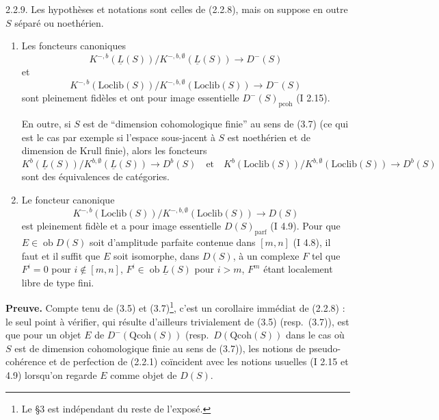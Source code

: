\begin{proposition} 2.2.9.
Les hypoth\`{e}ses et notations sont celles de (2.2.8), mais on suppose en outre $S$ s\'{e}par\'{e} ou noeth\'{e}rien.
\begin{enumerate}
\item[a)] Les foncteurs canoniques
\[
K^{-,b}(\underline{L}(S)) / K^{-,b,\emptyset}(\underline{L}(S)) \longrightarrow D^-(S)
\]
et
\[
K^{-,b}(\mathrm{Loclib}(S)) / K^{-,b,\emptyset}(\mathrm{Loclib}(S)) \longrightarrow D^-(S)
\]
sont pleinement fid\`{e}les et ont pour image essentielle $D^-(S)_{\mathrm{pcoh}}$ (I 2.15).

En outre, si $S$ est de ``dimension cohomologique finie'' au sens de (3.7) (ce qui est le cas par exemple si l'espace sous-jacent \`{a} $S$ est noeth\'{e}rien et de dimension de Krull finie), alors les foncteurs
\[
K^b(\underline{L}(S)) / K^{b,\emptyset}(\underline{L}(S)) \longrightarrow D^b(S) \quad \text{et} \quad K^b(\mathrm{Loclib}(S)) / K^{b,\emptyset}(\mathrm{Loclib}(S)) \longrightarrow D^b(S)
\]
sont des \'{e}quivalences de cat\'{e}gories.
\item[b)] Le foncteur canonique
\[
K^{-,b}(\mathrm{Loclib}(S)) / K^{-,b,\emptyset}(\mathrm{Loclib}(S)) \longrightarrow D(S)
\]
est pleinement fid\`{e}le et a pour image essentielle $D(S)_{\mathrm{parf}}$ (I 4.9). Pour que $E \in \operatorname{ob} D(S)$ soit d'amplitude parfaite contenue dans $[m,n]$ (I 4.8), il faut et il suffit que $E$ soit isomorphe, dans $D(S)$, \`{a} un complexe $F$ tel que $F^i = 0$ pour $i \notin [m,n]$, $F^i \in \operatorname{ob} \underline{L}(S)$ pour $i > m$, $F^m$ \'{e}tant localement libre de type fini.
\end{enumerate}
\end{proposition}

\noindent\textbf{Preuve.} Compte tenu de (3.5) et (3.7)\footnote{Le \S 3 est ind\'{e}pendant du reste de l'expos\'{e}.}, c'est un corollaire imm\'{e}diat de (2.2.8) : le seul point \`{a} v\'{e}rifier, qui r\'{e}sulte d'ailleurs trivialement de (3.5) (resp.~(3.7)), est que pour un objet $E$ de $D^-(\mathrm{Qcoh}(S))$ (resp.~$D(\mathrm{Qcoh}(S))$ dans le cas o\`{u} $S$ est de dimension cohomologique finie au sens de (3.7)), les notions de pseudo-coh\'{e}rence et de perfection de (2.2.1) co\"{i}ncident avec les notions usuelles (I 2.15 et 4.9) lorsqu'on regarde $E$ comme objet de $D(S)$.

